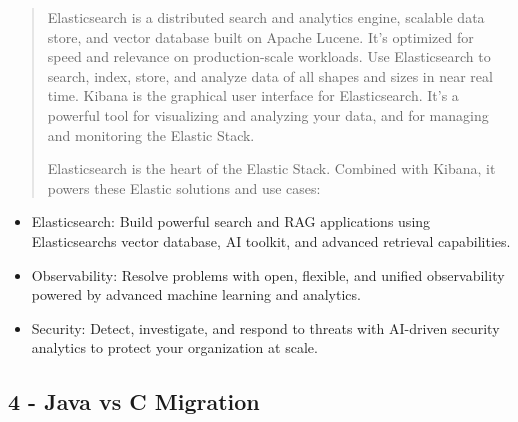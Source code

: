\documentclass[12pt,a4paper]{report}
\begin{document}
\begin{quote}
Elasticsearch is a distributed search and analytics engine, scalable
data store, and vector database built on Apache Lucene. It's optimized
for speed and relevance on production-scale workloads. Use Elasticsearch
to search, index, store, and analyze data of all shapes and sizes in
near real time. Kibana is the graphical user interface for
Elasticsearch. It's a powerful tool for visualizing and analyzing your
data, and for managing and monitoring the Elastic Stack.

Elasticsearch is the heart of the Elastic Stack. Combined with Kibana,
it powers these Elastic solutions and use cases:
\end{quote}

\begin{itemize}
\item
  Elasticsearch: Build powerful search and RAG applications using
  Elasticsearch\textquotesingle s vector database, AI toolkit, and
  advanced retrieval capabilities.
\item
  Observability: Resolve problems with open, flexible, and unified
  observability powered by advanced machine learning and analytics.
\item
  Security: Detect, investigate, and respond to threats with AI-driven
  security analytics to protect your organization at scale.
\end{itemize}


\subsection{4 - Java vs C
Migration}
\end{document}
